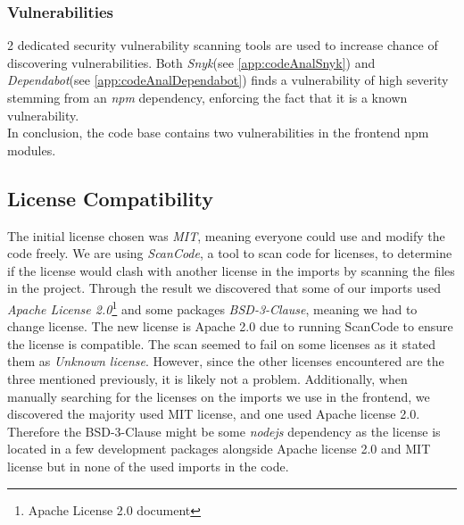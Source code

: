 \subsubsection{Vulnerabilities}
2 dedicated security vulnerability scanning tools are used to increase chance of discovering vulnerabilities. Both \textit{Snyk}(see \ref{app:codeAnalSnyk}) and \textit{Dependabot}(see \ref{app:codeAnalDependabot}) finds a vulnerability of high severity stemming from an \textit{npm} dependency, enforcing the fact that it is a known vulnerability. \\
In conclusion, the \mini code base contains two vulnerabilities in the frontend npm modules.


\subsection{License Compatibility}
\label{subsec:license_compatability}
The initial license chosen was \textit{MIT}, meaning everyone could use and modify the code freely. We are using \textit{ScanCode}\cite{Scancode}, a tool to scan code for licenses, to determine if the license would clash with another license in the imports by scanning the files in the project. 
Through the result we discovered that some of our imports used \textit{Apache License 2.0}\footnote{Apache License 2.0 document\cite{Apache2.0}} and some packages \textit{BSD-3-Clause}\cite{BSD3Clause}, meaning we had to change license.
The new license is Apache 2.0 due to running ScanCode to ensure the license is compatible. The scan seemed to fail on some licenses as it stated them as \textit{Unknown license}. However, since the other licenses encountered are the three mentioned previously, it is likely not a problem. Additionally, when manually searching for the licenses on the imports we use in the frontend, we discovered the majority used MIT license, and one used Apache license 2.0. Therefore the BSD-3-Clause might be some \textit{nodejs} dependency as the license is located in a few development packages alongside Apache license 2.0 and MIT license but in none of the used imports in the code.

